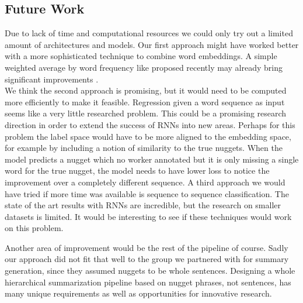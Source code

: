 \subsection{Future Work}
Due to lack of time and computational resources we could only try out a  limited amount of architectures and models.
Our first approach might have worked better with a more sophisticated technique to combine word embeddings. A simple weighted average by word frequency like proposed recently may already bring significant improvements \cite{sif2016}.\\
We think the second approach is promising, but it would need to be computed more efficiently to make it feasible. Regression given a word sequence as input seems like a very little researched problem. This could be a promising research direction in order to extend the success of RNNs into new areas. Perhaps for this problem the label space would have to be more aligned to the embedding space, for example by including a notion of similarity to the true nuggets. When the model predicts a nugget which no worker annotated but it is only missing a single word for the true nugget, the model needs to have lower loss to notice the improvement over a completely different sequence.
A third approach we would have tried if more time was available is sequence to sequence classification. The state of the art results with RNNs are incredible, but the research on smaller datasets is limited. It would be interesting to see if these techniques would work on this problem.

Another area of improvement would be the rest of the pipeline of course. Sadly our approach did not fit that well to the group we partnered with for summary generation, since they assumed nuggets to be whole sentences. Designing a whole hierarchical summarization pipeline based on nugget phrases, not sentences, has many unique requirements as well as opportunities for innovative research.
